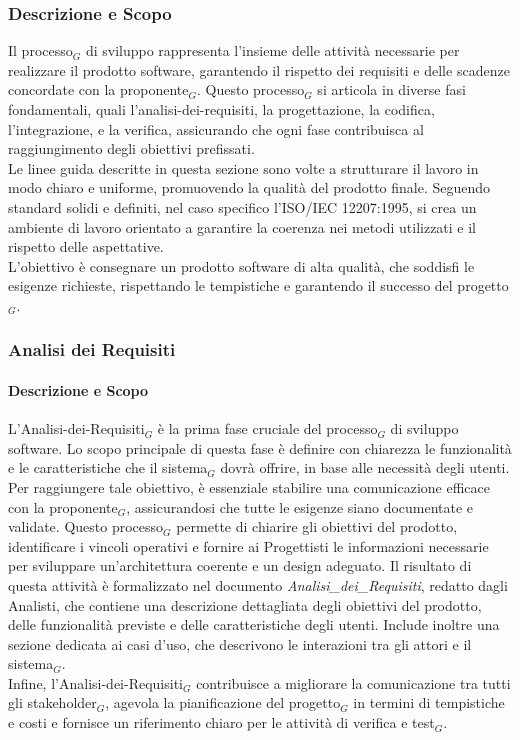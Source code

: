 \documentclass[10pt]{article}
\begin{document}
\begin{justify}
    \subsubsection{Descrizione e Scopo}
    Il processo$_G$ di sviluppo rappresenta l'insieme delle attività necessarie per realizzare il prodotto software, garantendo il rispetto dei requisiti e delle scadenze concordate con la proponente$_G$. Questo processo$_G$ si articola in diverse fasi fondamentali, quali l'analisi-dei-requisiti, la progettazione, la codifica, l'integrazione, e la verifica, assicurando che ogni fase contribuisca al raggiungimento degli obiettivi prefissati.\\
    Le linee guida descritte in questa sezione sono volte a strutturare il lavoro in modo chiaro e uniforme, promuovendo la qualità del prodotto finale. Seguendo standard solidi e definiti, nel caso specifico l'ISO/IEC 12207:1995, si crea un ambiente di lavoro orientato a garantire la coerenza nei metodi utilizzati e il rispetto delle aspettative.\\
    L'obiettivo è consegnare un prodotto software di alta qualità, che soddisfi le esigenze richieste, rispettando le tempistiche e garantendo il successo del progetto$_G$.\\

    \subsubsection{Analisi dei Requisiti}
    \label{analisi}
        \paragraph{Descrizione e Scopo}
        L'Analisi-dei-Requisiti$_G$ è la prima fase cruciale del processo$_G$ di sviluppo software. Lo scopo principale di questa fase è definire con chiarezza le funzionalità e le caratteristiche che il sistema$_G$ dovrà offrire, in base alle necessità degli utenti. Per raggiungere tale obiettivo, è essenziale stabilire una comunicazione efficace con la proponente$_G$, assicurandosi che tutte le esigenze siano documentate e validate. Questo processo$_G$ permette di chiarire gli obiettivi del prodotto, identificare i vincoli operativi e fornire ai Progettisti le informazioni necessarie per sviluppare un'architettura coerente e un design adeguato. Il risultato di questa attività è formalizzato nel documento \textit{Analisi\_dei\_Requisiti}, redatto dagli Analisti, che contiene una descrizione dettagliata degli obiettivi del prodotto, delle funzionalità previste e delle caratteristiche degli utenti. Include inoltre una sezione dedicata ai casi d'uso, che descrivono le interazioni tra gli attori e il sistema$_G$.\\
        Infine, l'Analisi-dei-Requisiti$_G$ contribuisce a migliorare la comunicazione tra tutti gli stakeholder$_G$, agevola la pianificazione del progetto$_G$ in termini di tempistiche e costi e fornisce un riferimento chiaro per le attività di verifica e test$_G$.\\


\end{justify}
\end{document}
